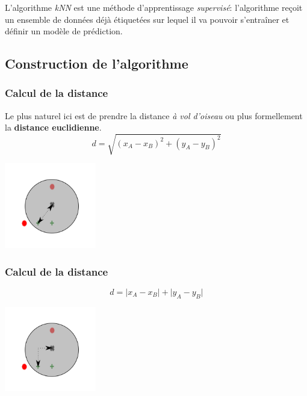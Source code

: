 \documentclass[svgnames,11pt]{beamer}
\begin{document}
\begin{frame}
    \frametitle{}
    \begin{aretenir}[Complément]
        L'algorithme \emph{kNN} est une méthode d'apprentissage \emph{supervisé}: l'algorithme reçoit un ensemble de données déjà étiquetées sur lequel il va pouvoir s’entraîner et définir un modèle de prédiction. 
        \end{aretenir}
\end{frame}

\subsection{Construction de l'algorithme}
\begin{frame}
    \frametitle{Calcul de la distance}
 Le plus naturel ici est de prendre la distance \emph{à vol d'oiseau} ou plus formellement la \textbf{distance euclidienne}.
$$d=\sqrt{(x_A-x_B)^2+(y_A-y_B)^2}$$
\begin{center}
\centering
\includegraphics[width=4cm]{ressources/euclidienne.png}
\label{IMG}
\end{center}
\end{frame}

\begin{frame}
    \frametitle{Calcul de la distance}

$$d=\lvert x_A-x_B\rvert+\lvert y_A-y_B\rvert$$
\begin{center}
\centering
\includegraphics[width=4cm]{ressources/manhattan.png}
\label{IMG}
\end{center}
\end{frame}
\end{document}
